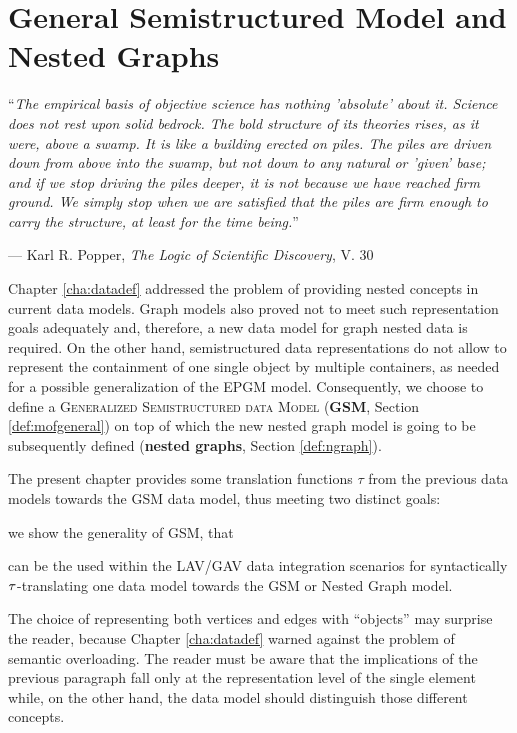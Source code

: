 \chapter{General Semistructured Model and Nested Graphs}\label{cha:graphsdef}
\epigraph{``\textit{The empirical basis of objective science has nothing 'absolute' about it. Science does not rest upon solid bedrock. The bold structure of its theories rises, as it were, above a swamp. It is like a building erected on piles. The piles are driven down from above into the swamp, but not down to any natural or 'given' base; and if we stop driving the piles deeper, it is not because we have reached firm ground. We simply stop when we are satisfied that the piles are firm enough to carry the structure, at least for the time being.}''}{--- Karl R. Popper, \textit{The Logic of Scientific Discovery}, V. 30}


Chapter \vref{cha:datadef}  addressed the problem of providing nested concepts in current data models. Graph models also proved not to meet such representation goals adequately and, therefore, a new data model for graph nested data is required. On the other hand, semistructured data representations do not allow to represent the containment of one single object by multiple containers, as needed for a possible generalization of the EPGM model. Consequently, we choose to   define   a \textsc{Generalized Semistructured data Model}  (\textbf{GSM}, Section \ref{def:mofgeneral}) on top of which the new nested graph model is going to be subsequently defined (\textbf{nested graphs}, Section \ref{def:ngraph}). 

The present chapter provides some translation functions $\tau$ from the previous data models towards the GSM data model, thus meeting two distinct goals: \begin{mylist}
	\item we show the generality of GSM, that
	\item can be the used within the LAV/GAV   data integration scenarios for syntactically $\ttransl$-translating one data model towards the GSM or Nested Graph model.
\end{mylist}
The choice of representing both vertices and edges with ``objects'' may surprise the reader, because Chapter \ref{cha:datadef} warned against the problem of semantic overloading. The reader must be aware that the implications of the previous paragraph fall only at the representation level of the single element while, on the other hand, the data model should distinguish those different concepts.


